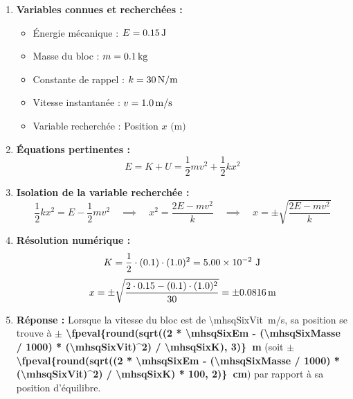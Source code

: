 \begin{enumerate}[label=\arabic*)]
    \item \textbf{Variables connues et recherchées :}
    \begin{itemize}[label= -]
        \item Énergie mécanique : $E = \qty{0.15}{J}$
        \item Masse du bloc : $m = \qty{\fpeval{\mhsqSixMasse / 1000}}{kg}$
        \item Constante de rappel : $k = \qty{30}{N/m}$
        \item Vitesse instantanée : $v = \qty{1.0}{m/s}$
        \item Variable recherchée : Position $x \text{ (m)}$
    \end{itemize}

    \item \textbf{Équations pertinentes :}
    \[
    E = K + U = \frac{1}{2} m v^2 + \frac{1}{2} k x^2
    \]

    \item \textbf{Isolation de la variable recherchée :}
    \[
    \frac{1}{2} k x^2 = E - \frac{1}{2} m v^2 \quad \implies \quad x^2 = \frac{2E - m v^2}{k} \quad \implies \quad x = \pm \sqrt{\frac{2E - m v^2}{k}}
    \]

    \item \textbf{Résolution numérique :}
    \[
    K = \frac{1}{2} \cdot \left(\fpeval{\mhsqSixMasse / 1000}\right) \cdot (\mhsqSixVit)^2 = \num[scientific-notation=true, round-mode=figures, round-precision=3]{\fpeval{0.5 * (\mhsqSixMasse / 1000) * (\mhsqSixVit)^2}} \text{ J}
    \]
    \[
    x = \pm \sqrt{\frac{2 \cdot \mhsqSixEm - (\fpeval{\mhsqSixMasse / 1000}) \cdot (\mhsqSixVit)^2}{\mhsqSixK}} = \pm \qty{\fpeval{round(sqrt((2 * \mhsqSixEm - (\mhsqSixMasse / 1000) * (\mhsqSixVit)^2) / \mhsqSixK), 4)}}{m}
    \]

    \item \textbf{Réponse :}
    Lorsque la vitesse du bloc est de \qty{\mhsqSixVit}{m/s}, sa position se trouve à \textbf{$\pm$ \qty{\fpeval{round(sqrt((2 * \mhsqSixEm - (\mhsqSixMasse / 1000) * (\mhsqSixVit)^2) / \mhsqSixK), 3)}}{m}} (soit \textbf{$\pm$ \qty{\fpeval{round(sqrt((2 * \mhsqSixEm - (\mhsqSixMasse / 1000) * (\mhsqSixVit)^2) / \mhsqSixK) * 100, 2)}}{cm}}) par rapport à sa position d'équilibre.
\end{enumerate}